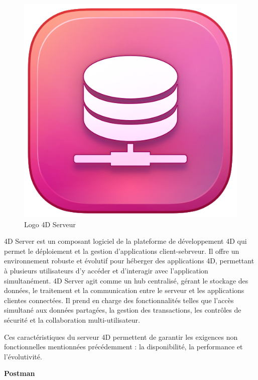 \begin{figure}[htbp]
   \centering
   \includegraphics[scale=0.2]{Images/4dsrv.png} 
   \caption{Logo 4D Serveur}
   \label{fig:4dsrv}
\end{figure}

4D Server est un composant logiciel de la plateforme de développement 
4D qui permet le déploiement et la gestion
d’applications client-sebrveur. Il offre un environnement robuste 
et évolutif pour héberger des applications 4D, 
permettant à plusieurs utilisateurs d’y accéder et d’interagir avec
l’application simultanément. 4D Server agit comme un hub centralisé, 
gérant le stockage des données, le traitement et la communication entre 
le serveur et les applications clientes connectées. Il prend en charge 
des fonctionnalités telles que l’accès simultané aux données partagées, 
la gestion des transactions, les contrôles de sécurité et la collaboration
multi-utilisateur\cite{4d}.
\newline

Ces caractéristiques du serveur 4D permettent de garantir les exigences non fonctionnelles mentionnées précédemment : la disponibilité, la performance et l'évolutivité. 
\newline

\large 
\textbf{Postman}

